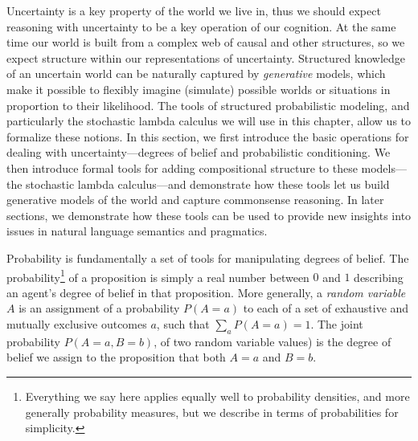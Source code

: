 \documentclass[12pt]{article}
\begin{document}
Uncertainty is a key property of the world we live in, thus we should expect reasoning with uncertainty to be a key operation of our cognition. 
At the same time our world is built from a complex web of causal and other structures, so we expect structure within our representations of uncertainty. 
Structured knowledge of an uncertain world can be naturally captured by \emph{generative} models, which make it possible to flexibly imagine (simulate) possible worlds or situations in proportion to their likelihood. 
The tools of structured probabilistic modeling, and particularly the stochastic lambda calculus we will use in this chapter, allow us to formalize these notions. 
In this section, we first introduce the basic operations for dealing with uncertainty---degrees of belief and probabilistic conditioning. 
We then introduce formal tools for adding compositional structure to these models---the stochastic lambda calculus---and demonstrate how these tools let us build generative models of the world and capture commonsense reasoning. 
In later sections, we demonstrate how these tools can be used to provide new insights into issues in natural language semantics and pragmatics.

Probability is fundamentally a set of tools for manipulating degrees of belief. 
The probability\footnote{Everything we say here applies equally well to probability densities, and more generally probability measures, but we describe in terms of probabilities for simplicity.} of a proposition is simply a real number between $0$ and $1$ describing an agent's degree of belief in that proposition. 
More generally, a \emph{random variable} $A$ is an assignment of a probability $P(A{=}a)$ to each of a set of exhaustive and mutually exclusive outcomes $a$, such that $\sum_a P(A{=}a)=1$. 
The joint probability $P(A{=}a,B{=}b)$, of two random variable values) is the degree of belief we assign to the proposition that both $A{=}a$ and $B{=}b$. 

\end{document}
